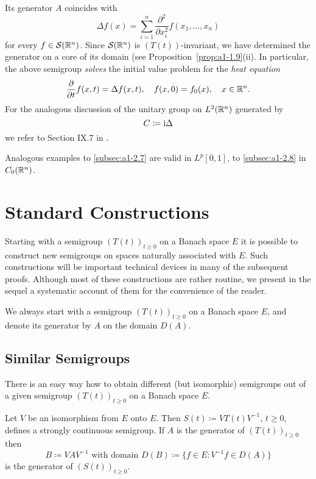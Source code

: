 Its generator $A$ coincides with
\[
    \Delta f(x) = \sum_{i=1}^{n} \frac{\partial^{2}}{\partial x_{i}^{2}} f(x_{1},\ldots,x_{n})
\]
for every $f \in \mathcal{S}(\mathbb{R}^{n})$.
Since $\mathcal{S}(\mathbb{R}^{n})$ is $(T(t))$-invariant, we have determined the generator on a core of its domain (see Proposition~\ref{prop:a1-1.9}(ii).
In particular, the above semigroup \emph{solves} the initial value problem for the \emph{heat equation}
\[
    \frac{\partial}{\partial t} f(x,t) = \Delta f(x,t), \quad f(x,0) = f_{0}(x), \quad x \in \mathbb{R}^{n}.
\]
For the analogous discussion of the unitary group on $L^{2}(\mathbb{R}^{n})$ generated by
\[
    C \coloneqq \mathrm{i}\Delta
\]
we refer to Section IX.7 in \citet{reedsimon:1975}. 

Analogous examples to \ref{subsec:a1-2.7} are valid in $L^{p}\left[ 0,1 \right]$, \resp to 
\ref{subsec:a1-2.8} in $C_{0}(\mathbb{R}^{n})$.
\section{Standard Constructions}\label{sec:a1-3}
Starting with a semigroup $(T(t))_{t \geq 0}$ on a Banach space $E$ it is possible to construct new semigroups on spaces naturally associated with $E$.
Such constructions will be important technical devices in many of the subsequent proofs.
Although most of these constructions are rather routine, we present in the sequel a systematic account of them for the convenience of the reader.

We always start with a semigroup $(T(t))_{t \geq 0}$ on a Banach space $E$, and denote its generator by $A$ on the domain $D(A)$.
\subsection{Similar Semigroups}\label{subsec:a1-3.1}
There is an easy way how to obtain different (but isomorphic) semigroups out of a given semigroup $(T(t))_{t \geq 0}$ on a Banach space $E$.

Let $V$ be an isomorphism from $E$ onto $E$.
Then $S(t) \coloneqq VT(t)V^{-1}$, $t \geq 0$, defines a strongly continuous semigroup.
If $A$ is the generator of $(T(t))_{t \geq 0}$ then
\[
    B \coloneqq VAV^{-1} \text{ with domain } D(B) \coloneqq \{f \in E \colon V^{-1}f \in D(A)\}
\]
is the generator of $(S(t))_{t \geq 0}$.
